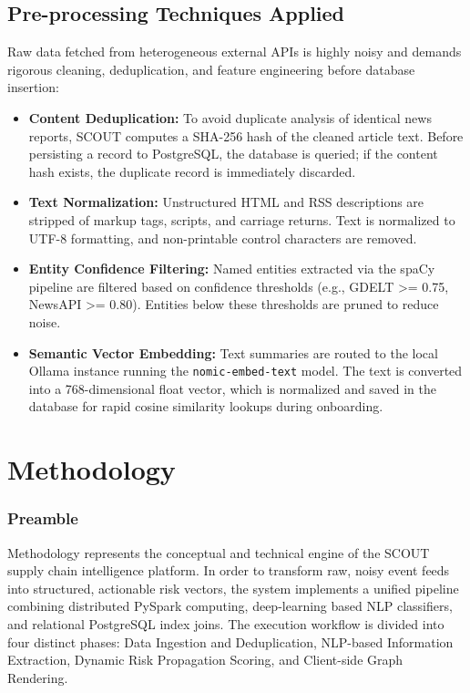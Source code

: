 \documentclass[12pt]{report}
\begin{document}
\section{Pre-processing Techniques Applied}
Raw data fetched from heterogeneous external APIs is highly noisy and demands rigorous cleaning, deduplication, and feature engineering before database insertion:
\begin{itemize}
  \item \textbf{Content Deduplication:} To avoid duplicate analysis of identical news reports, SCOUT computes a SHA-256 hash of the cleaned article text. Before persisting a record to PostgreSQL, the database is queried; if the content hash exists, the duplicate record is immediately discarded.
  \item \textbf{Text Normalization:} Unstructured HTML and RSS descriptions are stripped of markup tags, scripts, and carriage returns. Text is normalized to UTF-8 formatting, and non-printable control characters are removed.
  \item \textbf{Entity Confidence Filtering:} Named entities extracted via the spaCy pipeline are filtered based on confidence thresholds (e.g., GDELT >= 0.75, NewsAPI >= 0.80). Entities below these thresholds are pruned to reduce noise.
  \item \textbf{Semantic Vector Embedding:} Text summaries are routed to the local Ollama instance running the \texttt{nomic-embed-text} model. The text is converted into a 768-dimensional float vector, which is normalized and saved in the database for rapid cosine similarity lookups during onboarding.
\end{itemize}

\newpage
\chapter{Methodology}
\thispagestyle{fancy}

\subsection{Preamble}
Methodology represents the conceptual and technical engine of the SCOUT supply chain intelligence platform. In order to transform raw, noisy event feeds into structured, actionable risk vectors, the system implements a unified pipeline combining distributed PySpark computing, deep-learning based NLP classifiers, and relational PostgreSQL index joins. The execution workflow is divided into four distinct phases: Data Ingestion and Deduplication, NLP-based Information Extraction, Dynamic Risk Propagation Scoring, and Client-side Graph Rendering.
\end{document}
